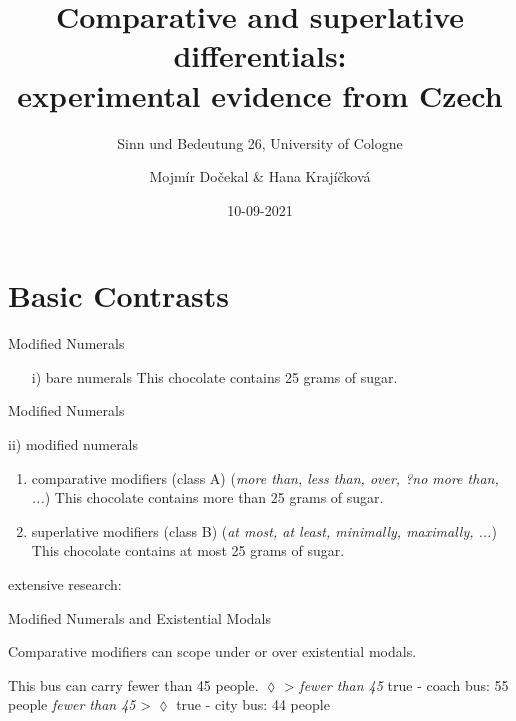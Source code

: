 \documentclass[10pt
]{beamer}
\title[Comparative and superlative differentials:\\
experimental evidence from Czech]{Comparative and superlative differentials:\\
experimental evidence from Czech}
\subtitle[SuB 26, University of Cologne]{Sinn und Bedeutung 26, University of Cologne}
\author[Mojmír Dočekal]{Mojmír Dočekal \& Hana Krajíčková}
\institute[FF MUNI]{Masaryk University}
\date{10-09-2021}
\begin{document}
\begin{frame}[plain]
\maketitle
\end{frame}

\section{Basic Contrasts}
\begin{frame}{Modified Numerals}

\begin{enumerate}
    \item[i)] \alert{bare numerals}
    \pex
    This chocolate contains 25 grams of sugar.
    \xe

\end{enumerate}
\end{frame}

\begin{frame}{Modified Numerals}

ii) \alert{modified numerals}

\begin{enumerate}
    \item \alert{comparative modifiers (class A)} (\textit{more than, less than, over, ?no more than, ...})
    \pex
    This chocolate contains more than 25 grams of sugar.
    \xe
    \item \alert{superlative modifiers (class B)} (\textit{at most, at least, minimally, maximally, ...})
    \pex
    This chocolate contains at most 25 grams of sugar.
    \xe
\end{enumerate}

\footnotesize
extensive research: \cite{buring2008least,geurts2007least,nouwen2008upper,nouwen2010two,cummins2010comparative,kennedy2015fregean,alexandropoulou2016pragmatic}


\end{frame}


\begin{frame}{Modified Numerals and Existential Modals}

Comparative modifiers can scope under or over existential modals.


\pex This bus can carry fewer than 45 people.
  \a $\lozenge$ > \textit{fewer than 45} \hfill true - coach bus: 55 people
  \a \textit{fewer than 45} > $\lozenge$ \hfill true - city bus: 44 people
  \xe


\end{frame}
\end{document}
